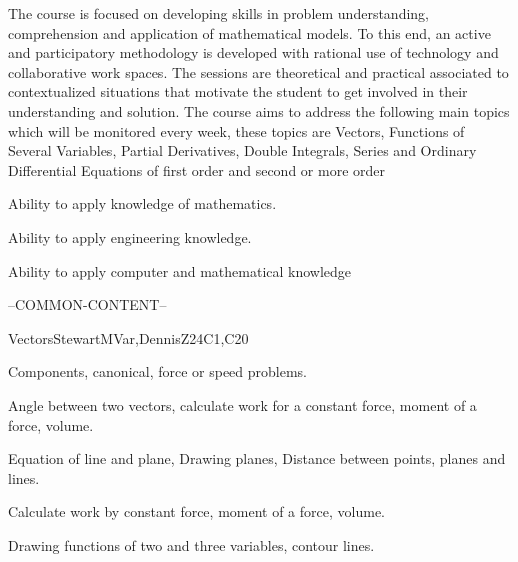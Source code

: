 \begin{syllabus}


\begin{justification}
  The course is focused on developing skills in problem understanding, comprehension and application of mathematical models. To this end, an active and participatory methodology is developed with rational use of technology and collaborative work spaces. The sessions are theoretical and practical associated to contextualized situations that motivate the student to get involved in their understanding and solution.
  The course aims to address the following main topics which will be monitored every week, these topics are Vectors, Functions of Several Variables, Partial Derivatives, Double Integrals, Series and Ordinary Differential Equations of first order and second or more order
\end{justification}

\begin{goals}
  \item Ability to apply knowledge of mathematics.
  \item Ability to apply engineering knowledge.
  \item Ability to apply computer and mathematical knowledge
\end{goals}

--COMMON-CONTENT--

\begin{unit}{Vectors}{}{StewartMVar,DennisZ}{24}{C1,C20}
   \begin{topics}      
    \item Components, canonical, force or speed problems.
    \item Angle between two vectors, calculate work for a constant force, moment of a force, volume.
    \item Equation of line and plane, Drawing planes, Distance between points, planes and lines.
    \item Calculate work by constant force, moment of a force, volume.
    \item Drawing functions of two and three variables, contour lines.
  \end{topics}


\end{unit}
\end{syllabus}
